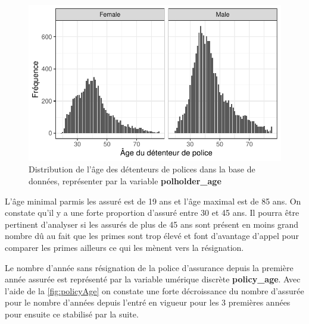 \documentclass[
]{article}
\begin{document}
\begin{figure}

{\centering \includegraphics{01-01-Pretraitement_files/figure-latex/graph_polholder_age-1} 

}

\caption{\label{fig:polholderAge}Distribution de l'âge des détenteurs de polices dans la base de données, représenter par la variable \textbf{polholder\_age}}\label{fig:graph_polholder_age}
\end{figure}

L'âge minimal parmis les assuré est de 19 ans et l'âge maximal est de 85
ans. On constate qu'il y a une forte proportion d'assuré entre 30 et 45
ans. Il pourra être pertinent d'analyser si les assurés de plus de 45
ans sont présent en moins grand nombre dû au fait que les primes sont
trop élevé et font d'avantage d'appel pour comparer les primes ailleurs
ce qui les mènent vers la résignation.

Le nombre d'année sans résignation de la police d'assurance depuis la
première année assurée est représenté par la variable umérique discrète
\textbf{policy\_age}. Avec l'aide de la \autoref{fig:policyAge} on
constate une forte décroissance du nombre d'assurée pour le nombre
d'années depuis l'entré en vigueur pour les 3 premières années pour
ensuite ce stabilisé par la suite.
\end{document}
